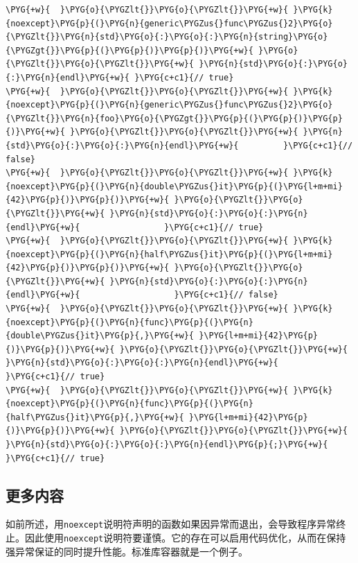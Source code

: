 \begin{codeblockbg}
\begin{Verbatim}[commandchars=\\\{\},breaklines=true,breakanywhere=true,fontsize=\codefont,xleftmargin=17bp]
\PYG{+w}{  }\PYG{o}{\PYGZlt{}}\PYG{o}{\PYGZlt{}}\PYG{+w}{ }\PYG{k}{noexcept}\PYG{p}{(}\PYG{n}{generic\PYGZus{}func\PYGZus{}2}\PYG{o}{\PYGZlt{}}\PYG{n}{std}\PYG{o}{:}\PYG{o}{:}\PYG{n}{string}\PYG{o}{\PYGZgt{}}\PYG{p}{(}\PYG{p}{)}\PYG{p}{)}\PYG{+w}{ }\PYG{o}{\PYGZlt{}}\PYG{o}{\PYGZlt{}}\PYG{+w}{ }\PYG{n}{std}\PYG{o}{:}\PYG{o}{:}\PYG{n}{endl}\PYG{+w}{ }\PYG{c+c1}{// true}
\PYG{+w}{  }\PYG{o}{\PYGZlt{}}\PYG{o}{\PYGZlt{}}\PYG{+w}{ }\PYG{k}{noexcept}\PYG{p}{(}\PYG{n}{generic\PYGZus{}func\PYGZus{}2}\PYG{o}{\PYGZlt{}}\PYG{n}{foo}\PYG{o}{\PYGZgt{}}\PYG{p}{(}\PYG{p}{)}\PYG{p}{)}\PYG{+w}{ }\PYG{o}{\PYGZlt{}}\PYG{o}{\PYGZlt{}}\PYG{+w}{ }\PYG{n}{std}\PYG{o}{:}\PYG{o}{:}\PYG{n}{endl}\PYG{+w}{         }\PYG{c+c1}{// false}
\PYG{+w}{  }\PYG{o}{\PYGZlt{}}\PYG{o}{\PYGZlt{}}\PYG{+w}{ }\PYG{k}{noexcept}\PYG{p}{(}\PYG{n}{double\PYGZus{}it}\PYG{p}{(}\PYG{l+m+mi}{42}\PYG{p}{)}\PYG{p}{)}\PYG{+w}{ }\PYG{o}{\PYGZlt{}}\PYG{o}{\PYGZlt{}}\PYG{+w}{ }\PYG{n}{std}\PYG{o}{:}\PYG{o}{:}\PYG{n}{endl}\PYG{+w}{                 }\PYG{c+c1}{// true}
\PYG{+w}{  }\PYG{o}{\PYGZlt{}}\PYG{o}{\PYGZlt{}}\PYG{+w}{ }\PYG{k}{noexcept}\PYG{p}{(}\PYG{n}{half\PYGZus{}it}\PYG{p}{(}\PYG{l+m+mi}{42}\PYG{p}{)}\PYG{p}{)}\PYG{+w}{ }\PYG{o}{\PYGZlt{}}\PYG{o}{\PYGZlt{}}\PYG{+w}{ }\PYG{n}{std}\PYG{o}{:}\PYG{o}{:}\PYG{n}{endl}\PYG{+w}{                   }\PYG{c+c1}{// false}
\PYG{+w}{  }\PYG{o}{\PYGZlt{}}\PYG{o}{\PYGZlt{}}\PYG{+w}{ }\PYG{k}{noexcept}\PYG{p}{(}\PYG{n}{func}\PYG{p}{(}\PYG{n}{double\PYGZus{}it}\PYG{p}{,}\PYG{+w}{ }\PYG{l+m+mi}{42}\PYG{p}{)}\PYG{p}{)}\PYG{+w}{ }\PYG{o}{\PYGZlt{}}\PYG{o}{\PYGZlt{}}\PYG{+w}{ }\PYG{n}{std}\PYG{o}{:}\PYG{o}{:}\PYG{n}{endl}\PYG{+w}{           }\PYG{c+c1}{// true}
\PYG{+w}{  }\PYG{o}{\PYGZlt{}}\PYG{o}{\PYGZlt{}}\PYG{+w}{ }\PYG{k}{noexcept}\PYG{p}{(}\PYG{n}{func}\PYG{p}{(}\PYG{n}{half\PYGZus{}it}\PYG{p}{,}\PYG{+w}{ }\PYG{l+m+mi}{42}\PYG{p}{)}\PYG{p}{)}\PYG{+w}{ }\PYG{o}{\PYGZlt{}}\PYG{o}{\PYGZlt{}}\PYG{+w}{ }\PYG{n}{std}\PYG{o}{:}\PYG{o}{:}\PYG{n}{endl}\PYG{p}{;}\PYG{+w}{            }\PYG{c+c1}{// true}
\end{Verbatim}
\end{codeblockbg}



\subsection{更多内容}



如前所述，用\texttt{noexcept}说明符声明的函数如果因异常而退出，会导致程序异常终止。因此使用\texttt{noexcept}说明符要谨慎。它的存在可以启用代码优化，从而在保持强异常保证的同时提升性能。标准库容器就是一个例子。



